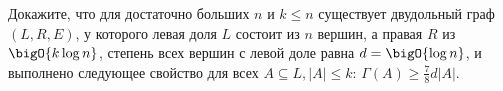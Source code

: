 Докажите, что для достаточно больших $n$ и $k \le n$ существует двудольный граф $(L, R, E)$, у которого
левая доля $L$ состоит из $n$ вершин, а правая $R$ из $\bigO{k \log n}$, степень всех вершин с левой доле
равна $d = \bigO{\log n}$, и выполнено следующее свойство для всех $A \subseteq L, |A| \le k$:
$\Gamma(A) \ge \frac{7}{8}d|A|$.
